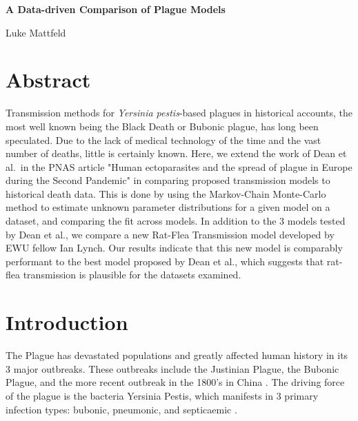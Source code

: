 \documentclass [letterpaper, 12pt] {article}
\begin{document}
\begin{titlepage}
	\centering
	\vspace*{\fill}

	\vspace*{0.5cm}

	\huge\bfseries
	A Data-driven Comparison of Plague Models

	\vspace*{0.5cm}

	\large Luke Mattfeld

	\vspace*{\fill}
\end{titlepage}

\tableofcontents
\newpage
{}

\section {Abstract}

Transmission methods for \textit{Yersinia pestis}-based plagues in historical accounts, the most well known being the Black Death or Bubonic plague, has long been speculated. Due to the lack of medical technology of the time and the vast number of deaths, little is certainly known. Here, we extend the work of Dean et al.\ in the PNAS article "Human ectoparasites and the spread of plague in Europe during the Second Pandemic" in comparing proposed transmission models to historical death data. This is done by using the Markov-Chain Monte-Carlo method to estimate unknown parameter distributions for a given model on a dataset, and comparing the fit across models. In addition to the 3 models tested by Dean et al., we compare a new Rat-Flea Transmission model developed by EWU fellow Ian Lynch. Our results indicate that this new model is comparably performant to the best model proposed by Dean et al., which suggests that rat-flea transmission is plausible for the datasets examined.

\pagebreak

\section {Introduction}

The Plague has devastated populations and greatly affected human history in its 3 major outbreaks. These outbreaks include the Justinian Plague, the Bubonic Plague, and the more recent outbreak in the 1800’s in China \cite{barbara_et_al_2016}.
The driving force of the plague is the bacteria Yersinia Pestis, which manifests in 3 primary infection types: bubonic, pneumonic, and septicaemic \cite{DITCHBURN201965}.
\end{document}
